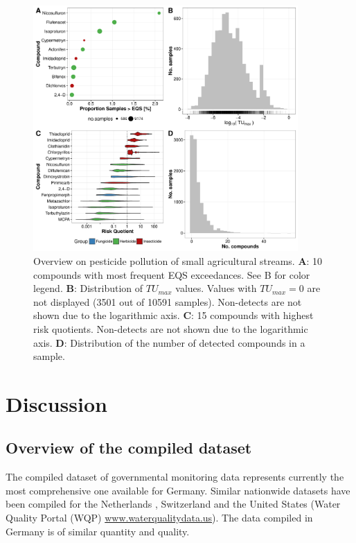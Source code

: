 \documentclass[journal=esthag,manuscript=article]{achemso}
\begin{document}
\begin{figure}[h]
  \includegraphics[width=0.9\textwidth]{figure5.pdf}
  \caption{Overview on pesticide pollution of small agricultural streams. 
      \textbf{A}: 10 compounds with most frequent EQS exceedances. See B for color legend.
      \textbf{B}: Distribution of $TU_{max}$ values. Values with $TU_{max} = 0$ are not displayed (3501 out of 10591 samples). Non-detects are not shown due to the logarithmic axis.
      \textbf{C}: 15 compounds with highest risk quotients. Non-detects are not shown due to the logarithmic axis.
      \textbf{D}: Distribution of the number of detected compounds in a sample.
  }
  \label{fig:fig5}
\end{figure}



\section{Discussion}
\subsection{Overview of the compiled dataset}
The compiled dataset of governmental monitoring data represents currently the most comprehensive one available for Germany.
Similar nationwide datasets have been compiled for the Netherlands \citep{vijver_spatial_2008}, Switzerland \citep{munz_pestizidmessungen_2011} and the United States (Water Quality Portal (WQP) \url{www.waterqualitydata.us}).
The data compiled in Germany is of similar quantity and quality.
\end{document}

